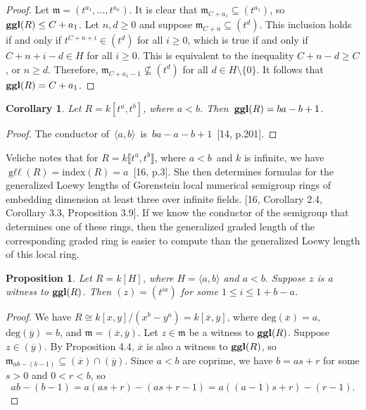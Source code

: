 \documentclass{amsart}
\newtheorem{proposition}[theorem]{Proposition}
\newtheorem{corollary}[theorem]{Corollary}
\theoremstyle{definition}
\theoremstyle{definition}
\DeclareMathOperator{\gll}{\text{g}\ell\ell}
\DeclareMathOperator{\ggl}{\bf{ggl}}
\numberwithin{equation}{section}
\theoremstyle{definition}
\begin{document}
{\begin{proof} 
Let $\mathfrak{m}=(t^{a_{1}},...,t^{a_{n}})$. It is clear that $\mathfrak{m}_{C+a_{1}} \subseteq (t^{a_{1}})$, so \,$\ggl(R) \leq C+a_{1}$. Let $n,d \geq 0$ and suppose $\mathfrak{m}_{C+n} \subseteq (t^d)$. This inclusion holds if and only if $t^{C+n+i} \in (t^d)$ for all $i \geq 0$, which is true if and only if\,
$C+n+i-d \in H$ for all $i \geq 0$. This is equivalent to the inequality
$C+n-d \geq C$, or
$n \geq d$.
Therefore, $\mathfrak{m}_{C+a_{1}-1} \not\subseteq (t^d)$ for all $d \in H \setminus \{0\}$. It follows that $\ggl(R)=C+a_{1}$.
\end{proof}\text{}
\begin{corollary}
Let $R=k[t^a,t^b]$, where $a<b$. Then \,$\ggl(R)=ba-b+1$.
\end{corollary}
\begin{proof}
The conductor of \,$\langle a,b \rangle$\, is \,$ba-a-b+1$ \,[14, p.201].
\end{proof}\text{}\newline 
Veliche notes that for $R=k\llbracket t^a,t^b \rrbracket$, where $a<b$\ and $k$ is infinite, we have $\gll(R)=\text{index}(R)=a$\, [16, p.3]. She then determines formulas for the generalized Loewy lengths of Gorenstein local numerical semigroup rings of embedding dimension at least three over infinite fields. [16, Corollary 2.4, Corollary 3.3, Proposition 3.9]. If we know the conductor of the semigroup that determines one of these rings, then the generalized graded length of the corresponding graded ring is easier to compute than the generalized Loewy length of this local ring.
\newline
\begin{proposition} Let $R=k[H]$, where $H=\langle a,b \rangle$ and $a<b.$ Suppose $z$ is a witness to $\ggl(R)$. Then $(z)=(t^{ia})$ for some $1 \leq i \leq 1+b-a$.
\end{proposition} 
\begin{proof} We have $R \cong k[x,y]/(x^b-y^a)=k[\overline{x},\overline{y}]$, where $\text{deg}(\overline{x})=a$, $\text{deg}(\overline{y})=b$, and $\mathfrak{m}=(\overline{x},\overline{y})$. Let $z \in \mathfrak{m}$ be a witness to $\ggl(R)$. Suppose $z \in (\overline{y})$. By Proposition 4.4, $\overline{x}$ is also a witness to $\ggl(R)$, so \,$\mathfrak{m}_{ab-(b-1)} \subseteq (\overline{x}) \cap (\overline{y})$. Since $a<b$ are coprime, we have $b=as+r$ for some $s>0$ and $0<r<b$, so \newline
\[
ab-(b-1)=a(as+r)-(as+r-1)=a((a-1)s+r)-(r-1).
\]
\end{proof}}
\end{document}

